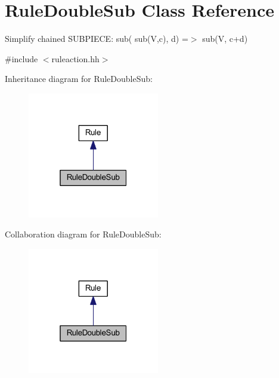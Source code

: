 \hypertarget{class_rule_double_sub}{}\section{Rule\+Double\+Sub Class Reference}
\label{class_rule_double_sub}


Simplify chained S\+U\+B\+P\+I\+E\+CE\+: {\ttfamily sub( sub(\+V,c), d) =$>$ sub(V, c+d)}  




{\ttfamily \#include $<$ruleaction.\+hh$>$}



Inheritance diagram for Rule\+Double\+Sub\+:
\nopagebreak
\begin{figure}[H]
\begin{center}
\leavevmode
\includegraphics[width=163pt]{class_rule_double_sub__inherit__graph}
\end{center}
\end{figure}


Collaboration diagram for Rule\+Double\+Sub\+:
\nopagebreak
\begin{figure}[H]
\begin{center}
\leavevmode
\includegraphics[width=163pt]{class_rule_double_sub__coll__graph}
\end{center}
\end{figure}
